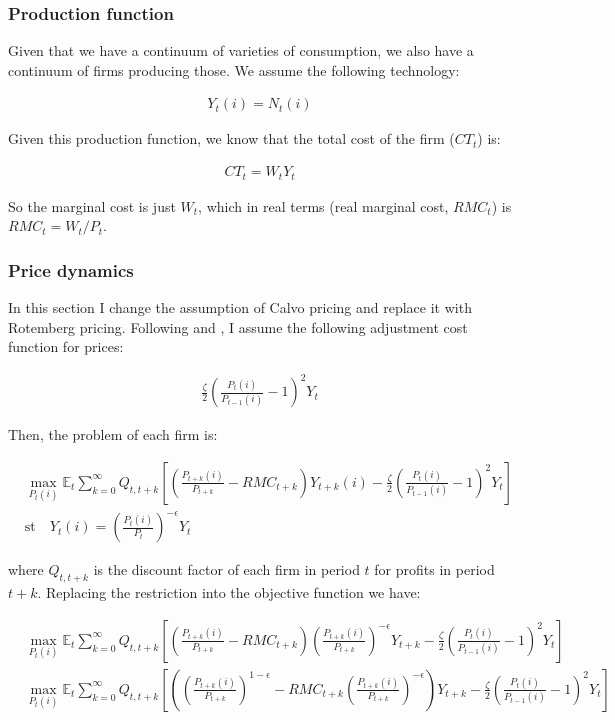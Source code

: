 \documentclass[12pt]{article}
\numberwithin{equation}{section}
\begin{document}
\subsubsection{Production function}

Given that we have a continuum of varieties of consumption, we also have a continuum of firms producing those. We assume the following technology:

\begin{align*}
Y_t(i)=N_t(i)
\end{align*}

Given this production function, we know that the total cost of the firm ($CT_t$) is:

\begin{align*}
CT_t=W_tY_t
\end{align*}

So the marginal cost is just $W_t$, which in real terms (real marginal cost, $RMC_t$) is $RMC_t=W_t/P_t$.

\subsubsection{Price dynamics}

In this section I change the assumption of Calvo pricing and replace it with Rotemberg pricing. Following \cite{AscariEtAl2012} and \cite{Rotemberg1982}, I assume the following adjustment cost function for prices:

\begin{align*}
\frac{\zeta}{2}\left(\frac{P_t(i)}{P_{t-1}(i)}-1\right)^2Y_t
\end{align*}

Then, the problem of each firm is:

\begin{align*}
&\max_{P_t(i)} \mathbb{E}_t \sum_{k=0}^{\infty}Q_{t,t+k}\left[\left(\frac{P_{t+k}(i)}{P_{t+k}} - RMC_{t+k} \right)Y_{t+k}(i) - \frac{\zeta}{2}\left(\frac{P_t(i)}{P_{t-1}(i)}-1\right)^2Y_t\right]\\
&\text{st} \quad Y_t(i)=\left(\frac{P_t(i)}{P_t}\right)^{-\epsilon}Y_t
\end{align*}

where $Q_{t,t+k}$ is the discount factor of each firm in period $t$ for profits in period $t+k$. Replacing the restriction into the objective function we have:

\begin{align*}
&\max_{P_t(i)} \mathbb{E}_t \sum_{k=0}^{\infty}Q_{t,t+k}\left[\left(\frac{P_{t+k}(i)}{P_{t+k}} - RMC_{t+k} \right)\left(\frac{P_{t+k}(i)}{P_{t+k}}\right)^{-\epsilon}Y_{t+k} - \frac{\zeta}{2}\left(\frac{P_t(i)}{P_{t-1}(i)}-1\right)^2Y_t\right]\\
&\max_{P_t(i)} \mathbb{E}_t \sum_{k=0}^{\infty}Q_{t,t+k}\left[\left(\left(\frac{P_{t+k}(i)}{P_{t+k}}\right)^{1-\epsilon} - RMC_{t+k}\left(\frac{P_{t+k}(i)}{P_{t+k}}\right)^{-\epsilon} \right)Y_{t+k} - \frac{\zeta}{2}\left(\frac{P_t(i)}{P_{t-1}(i)}-1\right)^2Y_t\right]
\end{align*}
\end{document}
